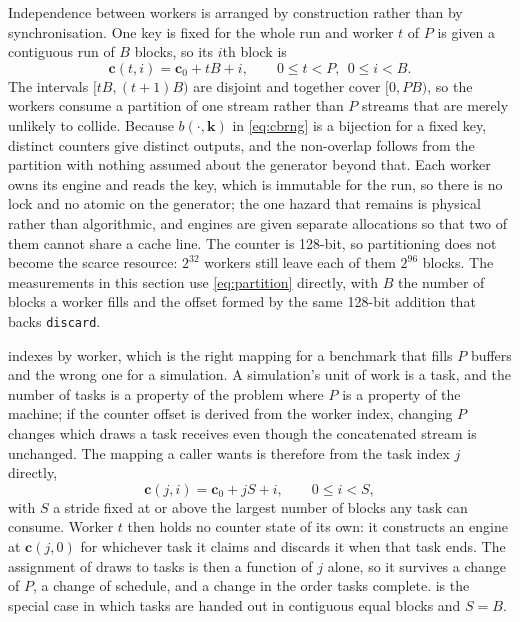 \documentclass[acmsmall,screen,review]{acmart}
\theoremstyle{acmdefinition}
\newcommand{\ctr}{\mathbf{c}}
\newcommand{\key}{\mathbf{k}}
\newcommand{\code}[1]{\texttt{#1}}
\begin{document}
Independence between workers is arranged by construction rather than by
synchronisation. One key is fixed for the whole run and worker $t$ of $P$ is
given a contiguous run of $B$ blocks, so its $i$th block is
\begin{equation}\label{eq:partition}
  \ctr(t, i) = \ctr_0 + tB + i, \qquad 0 \le t < P,\ \ 0 \le i < B.
\end{equation}
The intervals $[tB, (t+1)B)$ are disjoint and together cover $[0, PB)$, so the
workers consume a partition of one stream rather than $P$ streams that are
merely unlikely to collide. Because $b(\cdot, \key)$ in \cref{eq:cbrng} is a
bijection for a fixed key, distinct counters give distinct outputs, and the
non-overlap follows from the partition with nothing assumed about the
generator beyond that. Each worker owns its engine and reads the key, which is
immutable for the run, so there is no lock and no atomic on the generator; the
one hazard that remains is physical rather than algorithmic, and engines are
given separate allocations so that two of them cannot share a cache line. The
counter is 128-bit, so partitioning does not become the scarce resource:
$2^{32}$ workers still leave each of them $2^{96}$ blocks. The measurements in
this section use \cref{eq:partition} directly, with $B$ the number of blocks a
worker fills and the offset formed by the same 128-bit addition that backs
\code{discard}.

 indexes by worker, which is the right mapping for a
benchmark that fills $P$ buffers and the wrong one for a simulation. A
simulation's unit of work is a task, and the number of tasks is a property of
the problem where $P$ is a property of the machine; if the counter offset is
derived from the worker index, changing $P$ changes which draws a task receives
even though the concatenated stream is unchanged. The mapping a caller wants is
therefore from the task index $j$ directly,
\begin{equation}\label{eq:taskmap}
  \ctr(j, i) = \ctr_0 + jS + i, \qquad 0 \le i < S,
\end{equation}
with $S$ a stride fixed at or above the largest number of blocks any task can
consume. Worker $t$ then holds no counter state of its own: it constructs an
engine at $\ctr(j, 0)$ for whichever task it claims and discards it when that
task ends. The assignment of draws to tasks is then a function of $j$ alone, so
it survives a change of $P$, a change of schedule, and a change in the order
tasks complete.  is the special case in which tasks are
handed out in contiguous equal blocks and $S = B$.
\end{document}
